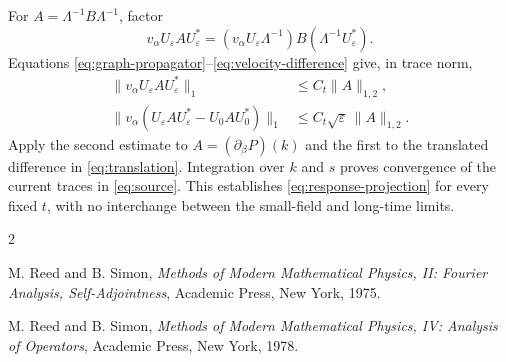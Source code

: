 \documentclass[11pt,a4paper]{article}
\theoremstyle{remark}
\numberwithin{equation}{section}
\begin{document}
For $A=\Lambda^{-1}B\Lambda^{-1}$, factor
\[
 v_\alpha U_\varepsilon A U_\varepsilon^*
   =(v_\alpha U_\varepsilon\Lambda^{-1})
        B(\Lambda^{-1}U_\varepsilon^*).
\]
Equations \eqref{eq:graph-propagator}--\eqref{eq:velocity-difference}
give, in trace norm,
\begin{equation}\label{eq:current-continuity}
 \begin{aligned}
 \|v_\alpha U_\varepsilon A U_\varepsilon^*\|_1
   &\le C_t\|A\|_{1,2},\\
 \|v_\alpha(U_\varepsilon A U_\varepsilon^*-U_0 A U_0^*)\|_1
   &\le C_t\sqrt\varepsilon\,\|A\|_{1,2}.
 \end{aligned}
\end{equation}
Apply the second estimate to $A=(\partial_\beta P)(k)$ and
the first to the translated difference in \eqref{eq:translation}.
Integration over $k$ and $s$ proves convergence of the current
traces in \eqref{eq:source}. This establishes
\eqref{eq:response-projection} for every fixed $t$, with no
interchange between the small-field and long-time limits.

\begin{thebibliography}{2}

M. Reed and B. Simon,
\emph{Methods of Modern Mathematical Physics, II: Fourier Analysis,
Self-Adjointness}, Academic Press, New York, 1975.

M. Reed and B. Simon,
\emph{Methods of Modern Mathematical Physics, IV: Analysis of Operators},
Academic Press, New York, 1978.

\end{thebibliography}
\end{document}
